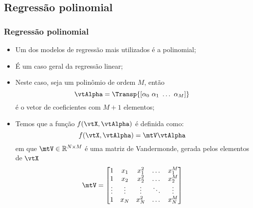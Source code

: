 \subsection{Regressão polinomial}
\begin{frame}
	\frametitle{Regressão polinomial}
	\begin{itemize}
		\item Um dos modelos de regressão mais utilizados é a polinomial;
		\item É um caso geral da regressão linear;
		\item Neste caso, seja um polinômio de ordem $M$, então
		\begin{equation}
			\vtAlpha = \Transp{\left[\alpha_0 \,\, \alpha_1 \,\, \dots \,\, \alpha_M \right]}
			\label{eq:mtARegPol}
		\end{equation}
		 é o vetor de coeficientes com $M+1$ elementos;
		\item Temos que a função $f(\vtX, \vtAlpha)$ é definida como:
		\[
			f(\vtX, \vtAlpha) = \mtV \vtAlpha
		\]
		em que $\mtV \in \mathbb{R}^{N \times M}$ é uma matriz de Vandermonde, gerada pelos elementos de $\vtX$
		{\scriptsize
		\begin{equation}
			\mtV = \begin{bmatrix} 
				1 & x_1 & x_1^2 & \dots & x_1^M \\
				1 & x_2 & x_2^2 & \dots & x_2^M \\
				\vdots & \vdots & \vdots & \ddots & \vdots \\
				1 & x_N & x_N^2 & \dots & x_N^M
			\end{bmatrix}
			\label{eq:mtVRegPol}
		\end{equation}}
	\end{itemize}
\end{frame}

